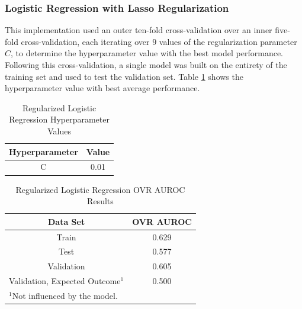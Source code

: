\documentclass[conference]{IEEEtran}
\begin{document}
\subsubsection{Logistic Regression with Lasso Regularization}
This implementation used an outer ten-fold cross-validation over an inner five-fold cross-validation, each iterating over $9$ values of the regularization parameter $C$, to determine the hyperparameter value with the best model performance. Following this cross-validation, a single model was built on the entirety of the training set and used to test the validation set. Table \ref{tab8} shows the hyperparameter value with best average performance. 

\begin{table}[htbp]
\caption{Regularized Logistic Regression Hyperparameter Values}
\begin{center}
\begin{tabular}{|c||c|}
\hline
\textbf{Hyperparameter} & \textbf{Value} \\
\hline
\hline
C & 0.01 \\
\hline
\end{tabular}
\label{tab8}
\end{center}
\end{table}

\begin{table}[htbp]
\caption{Regularized Logistic Regression OVR AUROC Results}
\begin{center}
\begin{tabular}{|c||c|}
\hline
\textbf{Data Set} & \textbf{OVR AUROC} \\
\hline
\hline
Train & 0.629 \\
\hline
Test & 0.577 \\
\hline
Validation & 0.605 \\
\hline
Validation, Expected Outcome$^{\mathrm{1}}$ & 0.500 \\
\hline
\multicolumn{2}{l}{$^{\mathrm{1}}$Not influenced by the model.}
\end{tabular}
\label{tab9}
\end{center}
\end{table}
\end{document}
